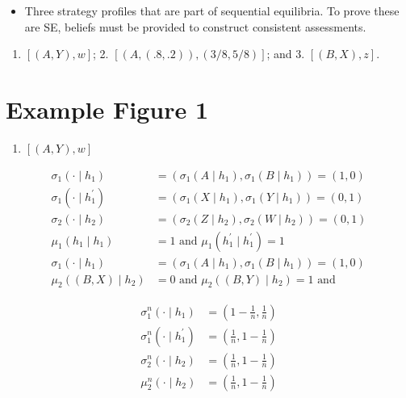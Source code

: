 \documentclass[10pt]{article}
\begin{document}
\begin{itemize}
  \item Three strategy profiles that are part of sequential equilibria. To prove these are SE, beliefs must be provided to construct consistent assessments.
\end{itemize}

\begin{enumerate}
  \item $[(A, Y), w]$; 2. $[(A,(.8, .2)),(3 / 8,5 / 8)]$; and 3. $[(B, X), z]$.
\end{enumerate}

\section*{Example Figure 1}
\begin{enumerate}
  \item $[(A, Y), w]$
\end{enumerate}

$$
\begin{aligned}
\sigma_{1}\left(\cdot \mid h_{1}\right) & =\left(\sigma_{1}\left(A \mid h_{1}\right), \sigma_{1}\left(B \mid h_{1}\right)\right)=(1,0) \\
\sigma_{1}\left(\cdot \mid h_{1}^{\prime}\right) & =\left(\sigma_{1}\left(X \mid h_{1}\right), \sigma_{1}\left(Y \mid h_{1}\right)\right)=(0,1) \\
\sigma_{2}\left(\cdot \mid h_{2}\right) & =\left(\sigma_{2}\left(Z \mid h_{2}\right), \sigma_{2}\left(W \mid h_{2}\right)\right)=(0,1) \\
\mu_{1}\left(h_{1} \mid h_{1}\right) & =1 \text { and } \mu_{1}\left(h_{1}^{\prime} \mid h_{1}^{\prime}\right)=1 \\
\sigma_{1}\left(\cdot \mid h_{1}\right) & =\left(\sigma_{1}\left(A \mid h_{1}\right), \sigma_{1}\left(B \mid h_{1}\right)\right)=(1,0) \\
\mu_{2}\left((B, X) \mid h_{2}\right) & =0 \text { and } \mu_{2}\left((B, Y) \mid h_{2}\right)=1 \text { and }
\end{aligned}
$$

$$
\begin{aligned}
\sigma_{1}^{n}\left(\cdot \mid h_{1}\right) & =\left(1-\frac{1}{n}, \frac{1}{n}\right) \\
\sigma_{1}^{n}\left(\cdot \mid h_{1}^{\prime}\right) & =\left(\frac{1}{n}, 1-\frac{1}{n}\right) \\
\sigma_{2}^{n}\left(\cdot \mid h_{2}\right) & =\left(\frac{1}{n}, 1-\frac{1}{n}\right) \\
\mu_{2}^{n}\left(\cdot \mid h_{2}\right) & =\left(\frac{1}{n}, 1-\frac{1}{n}\right)
\end{aligned}
$$
\end{document}
